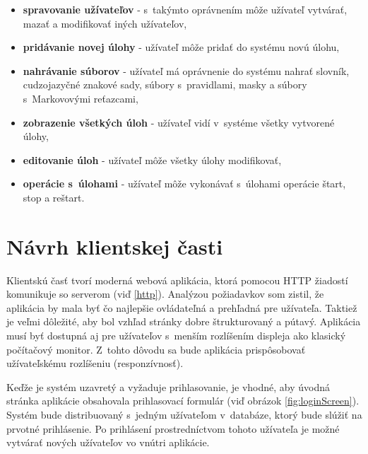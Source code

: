 \documentclass[slovak]{fitthesis}
\begin{document}
\begin{itemize}
    \item \textbf{spravovanie užívateľov} - s~takýmto oprávnením môže užívateľ vytvárať, mazať a modifikovať iných užívateľov,
    \item \textbf{pridávanie novej úlohy} - užívateľ môže pridať do systému novú úlohu,
    \item \textbf{nahrávanie súborov} - užívateľ má oprávnenie do systému nahrať slovník, cudzojazyčné znakové sady, súbory s~pravidlami, masky a súbory s~Markovovými reťazcami,
    \item \textbf{zobrazenie všetkých úloh} - užívateľ vidí v~systéme všetky vytvorené úlohy,
    \item \textbf{editovanie úloh} - užívateľ môže všetky úlohy modifikovať,
    \item \textbf{operácie s~úlohami} - užívateľ môže vykonávať s~úlohami operácie štart, stop a reštart.
\end{itemize}





\section{Návrh klientskej časti}\label{navrhKlient}
Klientskú časť tvorí moderná webová aplikácia, ktorá pomocou HTTP žiadostí komunikuje so serverom (viď \ref{http}). Analýzou požiadavkov som zistil, že aplikácia by mala byť čo najlepšie ovládateľná a prehľadná pre užívateľa. Taktiež je veľmi dôležité, aby bol vzhľad stránky dobre štrukturovaný a pútavý. Aplikácia musí byť dostupná aj pre užívateľov s~menším rozlíšením displeja ako klasický počítačový monitor. Z~tohto dôvodu sa bude aplikácia prispôsobovať užívateľskému rozlíšeniu (responzívnosť).

Keďže je systém uzavretý a vyžaduje prihlasovanie, je vhodné, aby úvodná stránka aplikácie obsahovala prihlasovací formulár (viď obrázok \ref{fig:loginScreen}). Systém bude distribuovaný s~jedným užívateľom v~databáze, ktorý bude slúžiť na prvotné prihlásenie. Po prihlásení prostredníctvom tohoto užívateľa je možné vytvárať nových užívateľov vo vnútri aplikácie.
\end{document}
